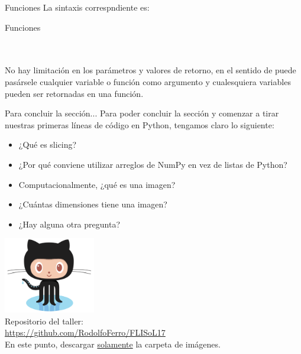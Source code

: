 \documentclass[usenames,dvipsnames]{beamer}
\begin{document}
  \begin{frame}{Funciones}
    La sintaxis correspndiente es:
    \begin{block}{Funciones}
      \\
      \\
      \\
      \vspace*{0.5cm}
    \end{block}
    \vspace*{0.5cm}

    No hay limitación en los parámetros y valores de retorno, en el sentido de
    puede pasársele cualquier variable o función como argumento y cualesquiera
    variables pueden ser retornadas en una función.
  \end{frame}

  \begin{frame}{Para concluir la sección...}
    Para poder concluir la sección y comenzar a tirar nuestras primeras
    líneas de código en Python, tengamos claro lo siguiente:
    \begin{itemize}
      \item ¿Qué es slicing?
      \item ¿Por qué conviene utilizar arreglos de NumPy en vez de listas
      de Python?
      \item Computacionalmente, ¿qué es una imagen?
      \item ¿Cuántas dimensiones tiene una imagen?
      \item ¿Hay alguna otra pregunta?
    \end{itemize}
  \end{frame}

  \begin{frame}[standout]
    \includegraphics[width=0.3\textwidth]{imgs/Octocat}\\
    Repositorio del taller:\\
    {\color{orange} \url{https://github.com/RodolfoFerro/FLISoL17}}\\
    \vspace*{0.5cm}
    En este punto, descargar \underline{solamente} la carpeta de imágenes.
  \end{frame}
\end{document}

